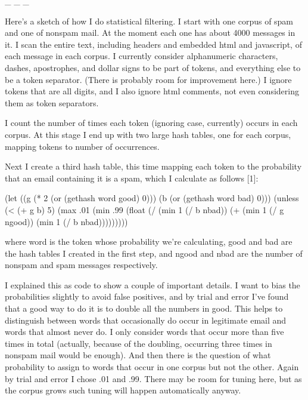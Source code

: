                     \_ \_ \_
                    

Here's a sketch of how I do statistical
                    filtering. I start with one corpus of spam and one of
                    nonspam mail. At the moment each one has about 4000 messages
                    in it. I scan the entire text, including headers and
                    embedded html and javascript, of each message in each
                    corpus. I currently consider alphanumeric characters,
                    dashes, apostrophes, and dollar signs to be part of tokens,
                    and everything else to be a token separator. (There is
                    probably room for improvement here.) I ignore tokens that
                    are all digits, and I also ignore html comments, not even
                    considering them as token separators.

I count the
                    number of times each token (ignoring case, currently) occurs
                    in each corpus. At this stage I end up with two large hash
                    tables, one for each corpus, mapping tokens to number of
                    occurrences.

Next I create a third hash table,
                    this time mapping each token to the probability that an
                    email containing it is a spam, which I calculate as follows
                    [1]:
                    
                      
(let ((g (* 2 (or (gethash word good) 0)))
      (b (or (gethash word bad) 0)))
   (unless (< (+ g b) 5)
     (max .01
          (min .99 (float (/ (min 1 (/ b nbad))
                             (+ (min 1 (/ g ngood))   
                                (min 1 (/ b nbad)))))))))

                    
                    where word is the token whose
                    probability we're calculating,
                    good and
                    bad are the hash tables I
                    created in the first step, and
                    ngood and
                    nbad are the number of nonspam
                    and spam messages respectively.

I explained this
                    as code to show a couple of important details. I want to
                    bias the probabilities slightly to avoid false positives,
                    and by trial and error I've found that a good way to do it
                    is to double all the numbers in
                    good. This helps to distinguish
                    between words that occasionally do occur in legitimate email
                    and words that almost never do. I only consider words that
                    occur more than five times in total (actually, because of
                    the doubling, occurring three times in nonspam mail would be
                    enough). And then there is the question of what probability
                    to assign to words that occur in one corpus but not the
                    other. Again by trial and error I chose .01 and .99. There
                    may be room for tuning here, but as the corpus grows such
                    tuning will happen automatically anyway.

